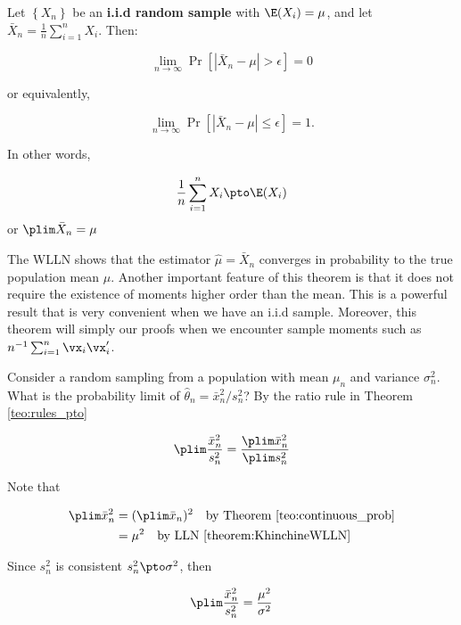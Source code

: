 \begin{theorem}\label{theorem:KhinchineWLLN}
	Let $\left\lbrace X_n\right\rbrace $ be an \textbf{i.i.d random sample} with $\E(X_i)=\mu$, and let $\bar{X}_n=\frac{1}{n}\sum_{i=1}^nX_i$. Then:
	
	\begin{equation*}
	\lim_{n\to \infty}\Pr\left[\left|\bar{X}_n-\mu\right|>\epsilon \right]=0
	\end{equation*} 
	
	or equivalently,
	
	\begin{equation*}
	\lim_{n\to \infty}\Pr\left[\left|\bar{X}_n-\mu\right|\leq \epsilon \right]=1.
	\end{equation*} 
	
	In other words,
	
	\begin{equation*}
	\frac{1}{n}\sum_{i=1}^nX_i\pto \E(X_i)
	\end{equation*}
%
	or  $\plim \bar{X}_n=\mu$
\end{theorem}

The WLLN shows that the estimator $\hat{\mu}=\bar{X}_n$ converges in probability to the true population mean $\mu$. Another important feature of this theorem is that it does not require the existence of moments higher order than the mean. This is a powerful result that is very convenient when we have an i.i.d sample. Moreover, this theorem will simply our proofs when we encounter sample moments such as $n^{-1}\sum_{i = 1}^n\vx_i\vx_i'$.

\begin{example}
Consider a random sampling from a population with mean $\mu_n$ and variance $\sigma_n^2$. What is the probability limit of $\widehat{\theta}_n = \bar{x}^2_n / s^2_n$? By the ratio rule in Theorem \ref{teo:rules_pto}

\begin{equation*}
  \plim \frac{\bar{x}^2_n}{s^2_n} = \frac{\plim \bar{x}^2_n}{\plim s^2_n}
\end{equation*}

Note that

\begin{equation*}
  \begin{aligned}
  \plim \bar{x}^2_n & = (\plim \bar{x}_n)^2 \quad \mbox{by Theorem \ref{teo:continuous_prob}}\\
                    & = \mu^2 \quad \mbox{by LLN \ref{theorem:KhinchineWLLN}}
  \end{aligned}
\end{equation*}

  Since $s^2_n$ is consistent $s^2_n\pto\sigma^2$, then
  
\begin{equation*}
  \plim \frac{\bar{x}^2_n}{s^2_n} = \frac{\mu^2}{\sigma^2}
\end{equation*}
\end{example}

